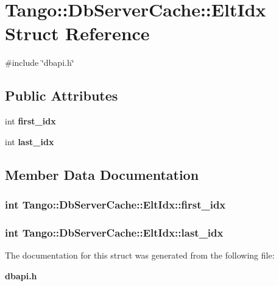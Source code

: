 \section{Tango\-:\-:Db\-Server\-Cache\-:\-:Elt\-Idx Struct Reference}
\label{structTango_1_1DbServerCache_1_1EltIdx}


{\ttfamily \#include \char`\"{}dbapi.\-h\char`\"{}}

\subsection*{Public Attributes}
\begin{DoxyCompactItemize}
\item 
int {\bf first\-\_\-idx}
\item 
int {\bf last\-\_\-idx}
\end{DoxyCompactItemize}


\subsection{Member Data Documentation}
\subsubsection[{first\-\_\-idx}]{\setlength{\rightskip}{0pt plus 5cm}int Tango\-::\-Db\-Server\-Cache\-::\-Elt\-Idx\-::first\-\_\-idx}\label{structTango_1_1DbServerCache_1_1EltIdx_a0e42efd9f31f600387eae69645c64f66}
\subsubsection[{last\-\_\-idx}]{\setlength{\rightskip}{0pt plus 5cm}int Tango\-::\-Db\-Server\-Cache\-::\-Elt\-Idx\-::last\-\_\-idx}\label{structTango_1_1DbServerCache_1_1EltIdx_ad952ed7a070f9bff4c26097a5a518faf}


The documentation for this struct was generated from the following file\-:\begin{DoxyCompactItemize}
\item 
{\bf dbapi.\-h}\end{DoxyCompactItemize}
